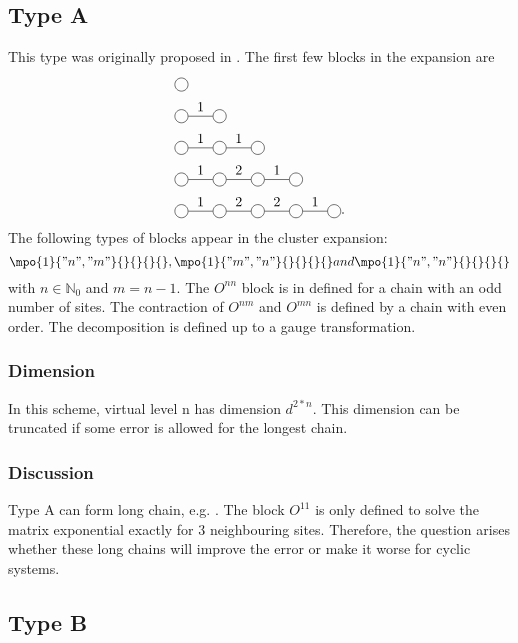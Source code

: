 
\subsection{Type A}
This type was originally proposed in \cite{Vanhecke2021}. The first few blocks in the expansion are
\begin{equation}
    \begin{split}
        &\mpob{1}{ {,}  }{}{}{}{{,,}} \\
        &\mpob{2}{ {,"1",}  }{}{}{}{{,,}}\\
        &\mpob{3}{ {,"1","1",}  }{}{}{}{{,,,}}\\
        &\mpob{4}{ {,"1","2","1",}  }{}{}{}{{,,,,,}}\\
        &\mpob{5}{ {,"1","2","2","1",}  }{}{}{}{{,,,,,}} .
    \end{split}
\end{equation}
The following types of blocks appear in the cluster expansion:
\begin{equation}
    \mpo{1}{ {"n","m"}  }{}{}{}{},\mpo{1}{ {"m ","n"}  }{}{}{}{} and \mpo{1}{ {"n","n"}  }{}{}{}{}
\end{equation}
with $n \in \mathbb{N}_0$ and $m=n-1$. The $O^{n n}$ block is in defined for a chain with an odd number of sites. The contraction of $O^{n m }$ and $O^{m n} $ is defined by a chain with even order. The decomposition is defined up to a gauge transformation.

\subsubsection{Dimension}

In this scheme, virtual level n has dimension $d^{2*n}$.  This dimension can be truncated if some error is allowed for the longest chain.

\subsubsection{Discussion}

Type A can form long chain, e.g.
. The block $O^{1 1}$ is only defined to solve the matrix exponential exactly for 3 neighbouring sites. Therefore, the question arises whether these long chains will improve the error or make it worse for cyclic systems.

\subsection{Type B}

